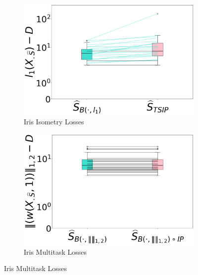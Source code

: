 \begin{figure}[t] %
    \centering
    \begin{subfigure}[b]{0.45\textwidth}
        \centering
        \includegraphics[width=\textwidth]{../figures/iris_standardized_0p1_1p0_isometry_losses}
        \caption{Iris Isometry Losses}
        \label{fig:iris_isometry_losses}
    \end{subfigure}
    \hfill
    \begin{subfigure}[b]{0.45\textwidth}
        \centering
        \includegraphics[width=\textwidth]{../figures/iris_standardized_0p1_1p0_group_lasso_losses}
        \caption{Iris Multitask Losses}
        \label{fig:iris_group_lasso_losses}
    \end{subfigure}

    \vspace{0.5cm} %


\end{figure}
